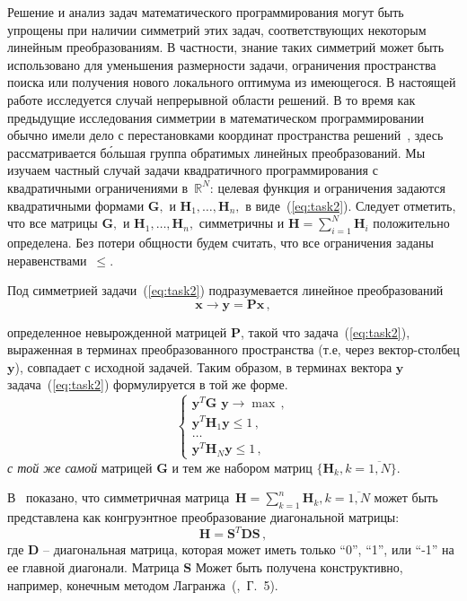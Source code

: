 \documentclass{llncs}
\begin{document}
Решение и анализ задач математического программирования могут быть упрощены при наличии симметрий этих задач, соответствующих некоторым линейным преобразованиям. В частности, знание таких симметрий может быть использовано для уменьшения размерности задачи, ограничения пространства поиска или получения нового локального оптимума из имеющегося.
В настоящей работе исследуется случай непрерывной области решений. В то время как предыдущие исследования симметрии в математическом программировании обычно имели дело с перестановками координат пространства решений~\cite{Kolokolov2012,KWM19,L12}, здесь рассматривается б\'{о}льшая группа обратимых линейных преобразований. Мы изучаем частный случай задачи квадратичного программирования с квадратичными ограничениями в~${\mathbb R}^N$: целевая функция и ограничения задаются квадратичными формами $\textbf{G}, $ и $\textbf{H}_1,\dots,\textbf{H}_n,$ в виде~(\ref{eq:task2}). Следует отметить, что все матрицы $\textbf{G}, $ и $\textbf{H}_1,\dots,\textbf{H}_n,$ симметричны и $\textbf{H} = \sum_{i=1}^{N}\textbf{H}_i$ положительно определена.
Без потери общности будем считать, что все ограничения заданы неравенствами~$\le$.

Под симметрией задачи~(\ref{eq:task2}) подразумевается линейное преобразований
\begin{equation}
\label{eq:Lin}
\textbf{x} \to \textbf{y}=\textbf{Px} \, ,
\end{equation}
%

определенное невырожденной матрицей $\textbf{P}$, такой что задача~(\ref{eq:task2}), выраженная в терминах преобразованного пространства
(т.е, через вектор-столбец $\textbf{y} $), совпадает с исходной задачей. Таким образом, в терминах вектора $\textbf{y}$ задача~(\ref{eq:task2}) формулируется в той же форме.
%
\begin{equation}
\label{eq:Tinit}
\left\{
\begin{array}{l}
\displaystyle
\textbf{y}^T \textbf{G y} \to {\max} \, , \\
\displaystyle
\textbf{y}^T\textbf{H}_1\textbf{y} \le  1 \, , \\
\displaystyle
\dots \\
\textbf{y}^T\textbf{H}_N\textbf{y} \le 1 \, ,
\end{array}
\right.
\end{equation}
%
\textit{с той же самой} матрицей $\textbf{G} $ и тем же набором матриц $\{\textbf{H}_k, k = \overline{1,N}\}$.

В~\cite{yurkov:symmetry} показано, что симметричная матрица~$\textbf{H} = \sum_{k=1}^{n}\textbf{H}_k, k = \overline{1,N}$ может быть представлена как конгруэнтное преобразование диагональной матрицы:
%
\begin{equation}
\label{eq:BSSTDS}
\textbf{H}=\textbf{S}^T\textbf{DS} \, ,
\end{equation}
%
где $\textbf{D}$ -- диагональная матрица, которая может иметь только ``0'', ``1'', или ``-1'' на ее главной диагонали. Матрица $\textbf{S}$ Может быть получена конструктивно, например, конечным методом Лагранжа~(\cite{Lancaster},~Г.~5).
\end{document}
